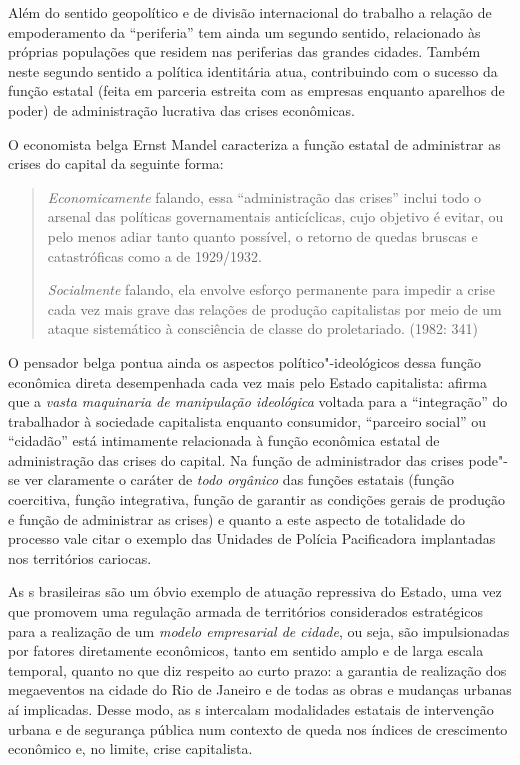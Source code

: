 Além do sentido geopolítico e de divisão internacional do trabalho a
relação de empoderamento da ``periferia'' tem ainda um segundo sentido,
relacionado às próprias populações que residem nas periferias das
grandes cidades. Também neste segundo sentido a política identitária
atua, contribuindo com o sucesso da função estatal (feita em parceria
estreita com as empresas enquanto aparelhos de poder) de administração
lucrativa das crises econômicas.

O economista belga Ernst Mandel caracteriza a função estatal de
administrar as crises do capital da seguinte forma:

\begin{quote}
\emph{Economicamente} falando, essa ``administração das crises''
inclui todo o arsenal das políticas governamentais anticíclicas, cujo
objetivo é evitar, ou pelo menos adiar tanto quanto possível, o retorno
de quedas bruscas e catastróficas como a de 1929/1932.

\emph{Socialmente} falando, ela envolve esforço permanente para
impedir a crise cada vez mais grave das relações de produção
capitalistas por meio de um ataque sistemático à consciência de classe
do proletariado. (1982: 341)
\end{quote}

O pensador belga pontua ainda os aspectos político"-ideológicos dessa
função econômica direta desempenhada cada vez mais pelo Estado
capitalista: afirma que a \emph{vasta maquinaria de manipulação
ideológica} voltada para a ``integração'' do trabalhador à sociedade
capitalista enquanto consumidor, ``parceiro social'' ou ``cidadão'' está
intimamente relacionada à função econômica estatal de administração das
crises do capital. Na função de administrador das crises pode"-se ver
claramente o caráter de \emph{todo orgânico} das funções estatais
(função coercitiva, função integrativa, função de garantir as condições
gerais de produção e função de administrar as crises) e quanto a este
aspecto de totalidade do processo vale citar o exemplo das Unidades de
Polícia Pacificadora implantadas nos territórios cariocas.

As s brasileiras são um óbvio exemplo de atuação repressiva do
Estado, uma vez que promovem uma regulação armada de territórios
considerados estratégicos para a realização de um \emph{modelo
empresarial de cidade}, ou seja, são impulsionadas por fatores
diretamente econômicos, tanto em sentido amplo e de larga escala
temporal, quanto no que diz respeito ao curto prazo: a garantia de
realização dos megaeventos na cidade do Rio de Janeiro e de todas as
obras e mudanças urbanas aí implicadas. Desse modo, as s intercalam
modalidades estatais de intervenção urbana e de segurança pública num
contexto de queda nos índices de crescimento econômico e, no limite,
crise capitalista.

